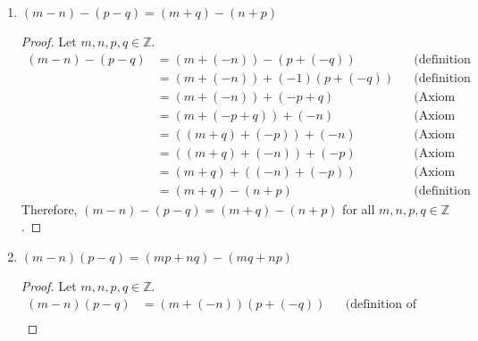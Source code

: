 \begin{enumerate}[label=(\roman*)]
    \item $(m-n)-(p-q)=(m+q)-(n+p)$
          \begin{proof}
              Let $m,n,p,q \in \mathbb{Z}$.
              \begin{align*}
                  (m-n)-(p-q) & = (m+(-n))-(p+(-q))     &  & \text{(definition of subtraction)} \\
                              & = (m+(-n))+(-1)(p+(-q)) &  & \text{(definition of subtraction)} \\
                              & = (m+(-n))+(-p+q)       &  & \text{(Axiom 1.1(iii))}            \\
                              & = (m+(-p+q))+(-n)       &  & \text{(Axiom 1.1(ii))}             \\
                              & = ((m+q)+(-p))+(-n)     &  & \text{(Axiom 1.1(ii))}             \\
                              & = ((m+q)+(-n))+(-p)     &  & \text{(Axiom 1.1(i))}              \\
                              & = (m+q)+((-n)+(-p))     &  & \text{(Axiom 1.1(ii))}             \\
                              & = (m+q)-(n+p)           &  & \text{(definition of subtraction)}
              \end{align*}
              Therefore, $(m-n)-(p-q)=(m+q)-(n+p)$ for all $m,n,p,q \in \mathbb{Z}$.
          \end{proof}
    \item $(m-n)(p-q)=(mp+nq)-(mq+np)$
          \begin{proof}
              Let $m,n,p,q \in \mathbb{Z}$.
              \begin{align*}
                  (m-n)(p-q) & = (m+(-n))(p+(-q))        &  & \text{(definition of subtraction)} \\

\end{align*}
\end{proof}
\end{enumerate}
